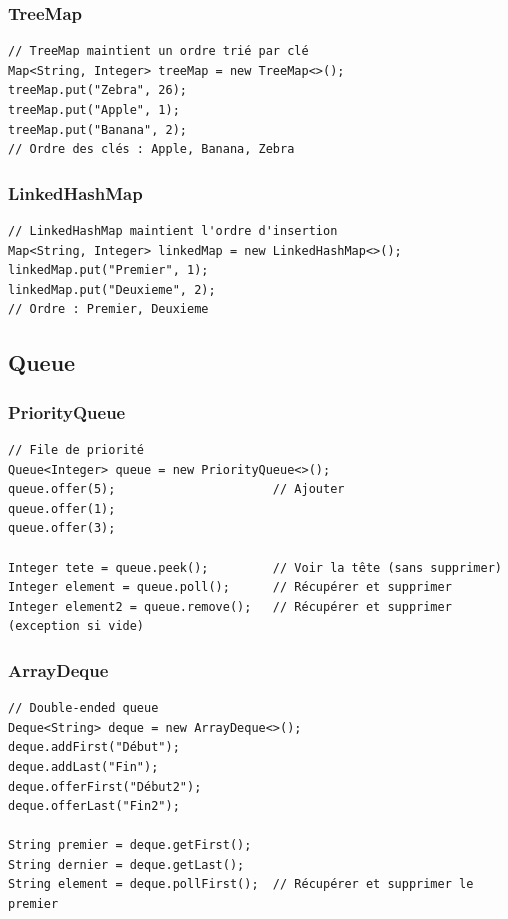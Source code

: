 \documentclass[11pt,a4paper]{article}
\begin{document}
\subsubsection{TreeMap}

\begin{lstlisting}
// TreeMap maintient un ordre trié par clé
Map<String, Integer> treeMap = new TreeMap<>();
treeMap.put("Zebra", 26);
treeMap.put("Apple", 1);
treeMap.put("Banana", 2);
// Ordre des clés : Apple, Banana, Zebra
\end{lstlisting}

\subsubsection{LinkedHashMap}

\begin{lstlisting}
// LinkedHashMap maintient l'ordre d'insertion
Map<String, Integer> linkedMap = new LinkedHashMap<>();
linkedMap.put("Premier", 1);
linkedMap.put("Deuxieme", 2);
// Ordre : Premier, Deuxieme
\end{lstlisting}

\subsection{Queue}

\subsubsection{PriorityQueue}

\begin{lstlisting}
// File de priorité
Queue<Integer> queue = new PriorityQueue<>();
queue.offer(5);                      // Ajouter
queue.offer(1);
queue.offer(3);

Integer tete = queue.peek();         // Voir la tête (sans supprimer)
Integer element = queue.poll();      // Récupérer et supprimer
Integer element2 = queue.remove();   // Récupérer et supprimer (exception si vide)
\end{lstlisting}

\subsubsection{ArrayDeque}

\begin{lstlisting}
// Double-ended queue
Deque<String> deque = new ArrayDeque<>();
deque.addFirst("Début");
deque.addLast("Fin");
deque.offerFirst("Début2");
deque.offerLast("Fin2");

String premier = deque.getFirst();
String dernier = deque.getLast();
String element = deque.pollFirst();  // Récupérer et supprimer le premier
\end{lstlisting}
\end{document}
